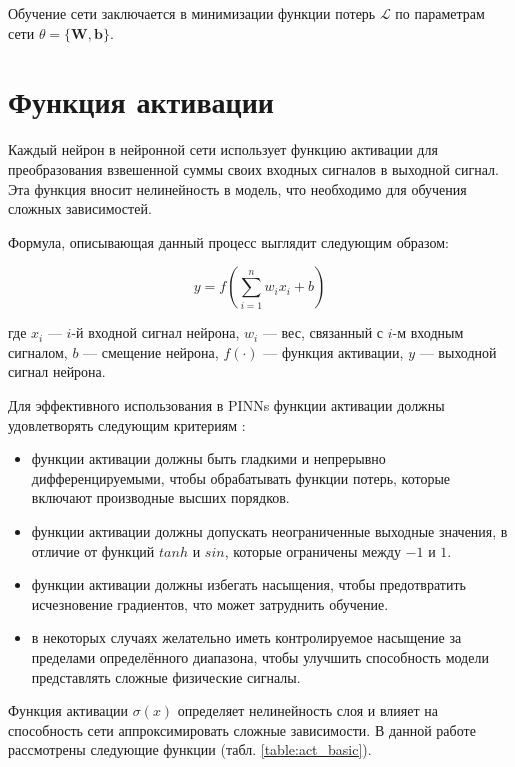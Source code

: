 Обучение сети заключается в минимизации функции потерь $\mathcal{L}$ по параметрам сети $\theta = \{\mathbf{W}, \mathbf{b}\}$.


\section{Функция активации}
Каждый нейрон в нейронной сети использует функцию активации для преобразования взвешенной
суммы своих входных сигналов в выходной сигнал. Эта функция вносит нелинейность в модель,
что необходимо для обучения сложных зависимостей.

Формула, описывающая данный процесс выглядит следующим образом:

$$y = f(\sum_{i=1}^{n} w_i x_i + b)$$

где $x_i$ — $i$-й входной сигнал нейрона, $w_i$ — вес, связанный с $i$-м входным сигналом, $b$
— смещение нейрона, $f(\cdot)$ — функция активации, $y$ — выходной сигнал нейрона.

Для эффективного использования в PINNs функции активации должны удовлетворять следующим
критериям \cite{0d752c79fb816703274a3d37f85a85689a2a9405}:
\begin{itemize}
    \item функции активации должны быть гладкими и
    непрерывно дифференцируемыми, чтобы обрабатывать функции потерь, которые включают
    производные высших порядков.
    \item функции активации должны допускать неограниченные
    выходные значения, в отличие от функций $tanh$ и $sin$, которые ограничены между $-1$ и $1$.
    \item функции активации должны избегать насыщения, чтобы предотвратить
    исчезновение градиентов, что может затруднить обучение.
    \item в некоторых случаях желательно иметь контролируемое насыщение за пределами определённого
    диапазона, чтобы улучшить способность модели представлять сложные физические сигналы.
\end{itemize}


Функция активации $\sigma(x)$ определяет нелинейность слоя и влияет на способность
сети аппроксимировать сложные зависимости. В данной работе рассмотрены следующие функции
(табл. \ref{table:act_basic}).

